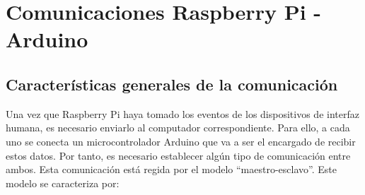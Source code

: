 \begin{itemize}
\end{itemize}
















\section{Comunicaciones Raspberry Pi - Arduino} \label{s2_3}

\subsection{Características generales de la comunicación} \label{s2_3_1}

Una vez que Raspberry Pi haya tomado los eventos de los dispositivos de interfaz humana, es necesario enviarlo al computador correspondiente. Para ello, a cada uno se conecta un microcontrolador Arduino que va a ser el encargado de recibir estos datos. Por tanto, es necesario establecer algún tipo de comunicación entre ambos. Esta comunicación está regida por el modelo ``maestro-esclavo''. Este modelo se caracteriza por:

